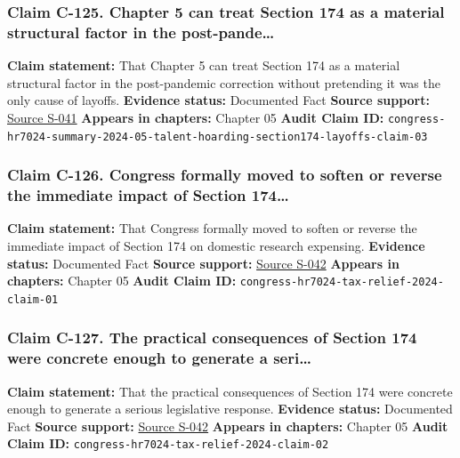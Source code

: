\documentclass[
  american,
  11pt,
  letterpaper,
]{article}
\begin{document}
\subsubsection{Claim C-125. Chapter 5 can treat Section 174 as a
material structural factor in the
post-pande\ldots{}}\label{claim-c-125-chapter-5-can-treat-section-174-as-a-material-structural-factor-in-the-post-pande}

\textbf{Claim statement:} That Chapter 5 can treat Section 174 as a
material structural factor in the post-pandemic correction without
pretending it was the only cause of layoffs. \textbf{Evidence status:}
Documented Fact \textbf{Source support:}
\hyperref[source-s-041-h-r-7024-tax-relief-for-american-families-and-workers-act-of-2024-crs-summary]{Source
S-041} \textbf{Appears in chapters:} Chapter 05 \textbf{Audit Claim ID:}
\texttt{congress-hr7024-summary-2024-05-talent-hoarding-section174-layoffs-claim-03}

\subsubsection{Claim C-126. Congress formally moved to soften or reverse
the immediate impact of Section
174\ldots{}}\label{claim-c-126-congress-formally-moved-to-soften-or-reverse-the-immediate-impact-of-section-174}

\textbf{Claim statement:} That Congress formally moved to soften or
reverse the immediate impact of Section 174 on domestic research
expensing. \textbf{Evidence status:} Documented Fact \textbf{Source
support:}
\hyperref[source-s-042-h-r-7024-tax-relief-for-american-families-and-workers-act-of-2024]{Source
S-042} \textbf{Appears in chapters:} Chapter 05 \textbf{Audit Claim ID:}
\texttt{congress-hr7024-tax-relief-2024-claim-01}

\subsubsection{Claim C-127. The practical consequences of Section 174
were concrete enough to generate a
seri\ldots{}}\label{claim-c-127-the-practical-consequences-of-section-174-were-concrete-enough-to-generate-a-seri}

\textbf{Claim statement:} That the practical consequences of Section 174
were concrete enough to generate a serious legislative response.
\textbf{Evidence status:} Documented Fact \textbf{Source support:}
\hyperref[source-s-042-h-r-7024-tax-relief-for-american-families-and-workers-act-of-2024]{Source
S-042} \textbf{Appears in chapters:} Chapter 05 \textbf{Audit Claim ID:}
\texttt{congress-hr7024-tax-relief-2024-claim-02}
\end{document}
